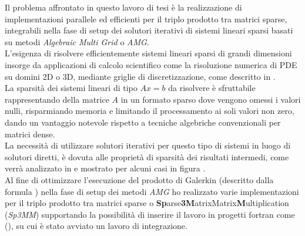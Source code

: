 \label{abstract}

Il problema affrontato in questo lavoro di tesi è la realizzazione di implementazioni 
parallele ed efficienti per il triplo prodotto tra matrici sparse,
integrabili nella fase di setup dei solutori iterativi di sistemi lineari sparsi basati su metodi 
\emph{Algebraic Multi Grid} o \emph{AMG}.\\
L'esigenza di risolvere efficientemente sistemi lineari sparsi di grandi dimensioni 
insorge da applicazioni di calcolo scientifico come la risoluzione numerica di PDE su domini 2D o 3D, 
mediante griglie di discretizzazione, come descritto in .\\
La sparsità dei sistemi lineari di tipo $Ax=b$ da risolvere è sfruttabile rappresentando 
della matrice $A$ in un formato sparso dove vengono omessi i valori nulli,
risparmiando memoria e limitando il processamento ai soli valori non zero,
dando un vantaggio notevole rispetto a tecniche algebriche convenzionali per matrici dense.\\
La necessità di utilizzare solutori iterativi per questo tipo di sistemi in luogo di solutori diretti,
è dovuta alle proprietà di sparsità dei risultati intermedi, come verrà analizzato in 
e mostrato per alcuni casi in figura .\\
%
Al fine di ottimizzare l'esecuzione del prodotto di Galerkin (descritto dalla formula ) nella fase di setup 
dei metodi \emph{AMG} ho realizzato varie implementazioni per 
il triplo prodotto tra matrici sparse o {\bf{Sp}}arse{\bf{3}}{\bf{M}}atrixMatrix{\bf{M}}ultiplication (\emph{Sp3MM})
supportando la possibilità di inserire il lavoro in progetti fortran come \\ (),
su cui è stato avviato un lavoro di integrazione.

